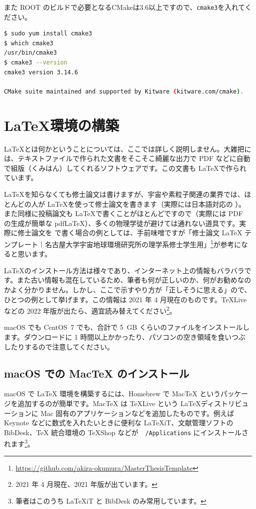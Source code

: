 また ROOT のビルドで必要となるCMakeは3.6以上ですので、\texttt{cmake3}を入れてください。

\begin{lstlisting}[language=bash]
$ sudo yum install cmake3
$ which cmake3
/usr/bin/cmake3
$ cmake3 --version
cmake3 version 3.14.6

CMake suite maintained and supported by Kitware (kitware.com/cmake).
\end{lstlisting}

\chapter{\LaTeX 環境の構築}
\label{chap:LaTeX}

\LaTeX とは何かということについては、ここでは詳しく説明しません。大雑把には、テキストファイルで作られた文書をそこそこ綺麗な出力で PDF などに自動で組版（くみはん）してくれるソフトウェアです。この文書も \LaTeX で作られています。

\LaTeX を知らなくても修士論文は書けますが、宇宙や素粒子関連の業界では、ほとんどの人が \LaTeX を使って修士論文を書きます（実際には日本語対応の \pLaTeX）。また同様に投稿論文も \LaTeX で書くことがほとんどですので（実際には PDF の生成が簡単な pdf\LaTeX）、多くの物理学徒が避けては通れない道具です。実際に修士論文を \pLaTeX で書く場合の例としては、手前味噌ですが「修士論文 LaTeX テンプレート｜名古屋大学宇宙地球環境研究所の理学系修士学生用」\footnote{\url{https://github.com/akira-okumura/MasterThesisTemplate}}が参考になると思います。

\LaTeX のインストール方法は様々であり、インターネット上の情報もバラバラです。また古い情報も混在しているため、筆者も何が正しいのか、何がお勧めなのかよく分かりません。しかし、ここで示すやり方が「正しそうに思える」ので、ひとつの例として挙げます。この情報は 2021 年 4 月現在のものです。TeXLive などの 2022 年版が出たら、適宜読み替えてください\footnote{2021 年 4 月現在、2021 年版が出ています。}。

macOS でも CentOS~7 でも、合計で 5~GB くらいのファイルをインストールします。ダウンロードに 1 時間以上かかったり、パソコンの空き領域を食いつぶしたりするので注意してください。

\section{macOS での MacTeX のインストール}

macOS で LaTeX 環境を構築するには、Homebrew で MacTeX というパッケージを追加するのが簡単です。MacTeX は TeXLive という \LaTeX ディストリビューションに Mac 固有のアプリケーションなどを追加したものです。例えば Keynote などに数式を入れたいときに便利な LaTeXiT、文献管理ソフトの BibDesk、TeX 統合環境の TeXShop などが　\texttt{/Applications} にインストールされます\footnote{筆者はこのうち LaTeXiT と BibDesk のみ常用しています。}。

